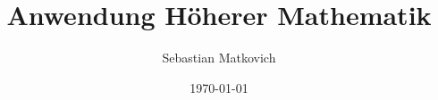 \documentclass[
	11pt, %
]{beamer}
\title[Anw. h\"ohere Mathe]{Anwendung Höherer Mathematik} %
\author[]{Sebastian Matkovich} %
\institute[FHCW]{FH Campus Wien \\ \smallskip \textit{sebastianmatkovich@gmail.com}} %
\date[\today]{ \today} %
\begin{document}

\begin{frame}
	\titlepage %
\end{frame}



\begin{frame}
	
	\tableofcontents %
\end{frame}

\end{document}
